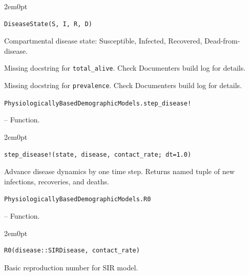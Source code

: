 \begin{adjustwidth}{2em}{0pt}


\begin{verbatim}
DiseaseState(S, I, R, D)
\end{verbatim}

Compartmental disease state: Susceptible, Infected, Recovered, Dead-from-disease.



\end{adjustwidth}

\begin{tcolorbox}[toptitle=-1mm,bottomtitle=1mm,colback=admonition-warning!50!white,colframe=admonition-warning,title=\textbf{Missing docstring.}]
Missing docstring for \texttt{total\_alive}. Check Documenter{\textquotesingle}s build log for details.

\end{tcolorbox}


\begin{tcolorbox}[toptitle=-1mm,bottomtitle=1mm,colback=admonition-warning!50!white,colframe=admonition-warning,title=\textbf{Missing docstring.}]
Missing docstring for \texttt{prevalence}. Check Documenter{\textquotesingle}s build log for details.

\end{tcolorbox}

\hypertarget{14554590938753828464}{\texttt{PhysiologicallyBasedDemographicModels.step\_disease!}}  -- {Function.}

\begin{adjustwidth}{2em}{0pt}


\begin{verbatim}
step_disease!(state, disease, contact_rate; dt=1.0)
\end{verbatim}

Advance disease dynamics by one time step. Returns named tuple of new infections, recoveries, and deaths.



\end{adjustwidth}
\hypertarget{726926314690397165}{\texttt{PhysiologicallyBasedDemographicModels.R0}}  -- {Function.}

\begin{adjustwidth}{2em}{0pt}


\begin{verbatim}
R0(disease::SIRDisease, contact_rate)
\end{verbatim}

Basic reproduction number for SIR model.



\end{adjustwidth}

